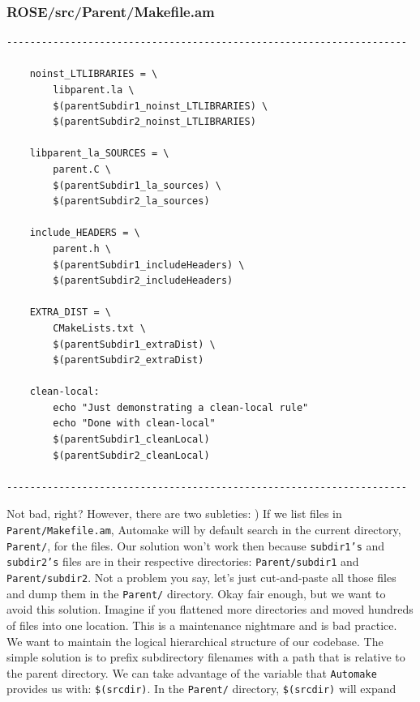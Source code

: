 \subsubsection{ROSE/src/Parent/Makefile.am}
    \begin{verbatim}
---------------------------------------------------------------------

    noinst_LTLIBRARIES = \
        libparent.la \
        $(parentSubdir1_noinst_LTLIBRARIES) \
        $(parentSubdir2_noinst_LTLIBRARIES)

    libparent_la_SOURCES = \
        parent.C \
        $(parentSubdir1_la_sources) \ 
        $(parentSubdir2_la_sources)

    include_HEADERS = \
        parent.h \
        $(parentSubdir1_includeHeaders) \ 
        $(parentSubdir2_includeHeaders) 

    EXTRA_DIST = \
        CMakeLists.txt \
        $(parentSubdir1_extraDist) \
        $(parentSubdir2_extraDist)

    clean-local:
        echo "Just demonstrating a clean-local rule"
        echo "Done with clean-local"
        $(parentSubdir1_cleanLocal)
        $(parentSubdir2_cleanLocal)

---------------------------------------------------------------------
    \end{verbatim}
Not bad, right? However, there are two subleties:
\newline\newline
1) If we list files in \texttt{Parent/Makefile.am},
Automake will by default search in the current directory, \texttt{Parent/}, for the files.
Our solution won't work then because \texttt{subdir1's} and \texttt{subdir2's} files are in
their respective directories: \texttt{Parent/subdir1} and \texttt{Parent/subdir2}. Not a
problem you say, let's just cut-and-paste all those files and dump them in the \texttt{Parent/}
directory. Okay fair enough, but we want to avoid this solution. Imagine if you
flattened more directories and moved hundreds of files into one location. This is a maintenance
nightmare and is bad practice. We want to maintain the logical hierarchical structure of our
codebase.
\newline\newline
The simple solution is to prefix subdirectory filenames with a path that is relative to
the parent directory. We can take advantage of the variable that \texttt{Automake} provides us
with: \texttt{\$(srcdir)}. In the \texttt{Parent/} directory, \texttt{\$(srcdir)} will expand
